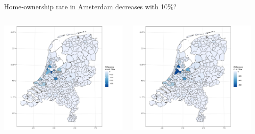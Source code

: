 \documentclass{beamer}
\begin{document}
\begin{frame}{Home-ownership rate in Amsterdam decreases with 10\%?}
	\begin{columns}
		\begin{column}{0.5\textwidth}
			\begin{center}
				\includegraphics[width=1.1\textwidth]{../fig/p_diff_out}      
			\end{center}
		\end{column}
		\begin{column}{0.5\textwidth} 	
			\begin{center}
				\includegraphics[width=1.1\textwidth]{../fig/p_diff_in}      
			\end{center}
		\end{column}
	\end{columns}
\end{frame}
\end{document}
